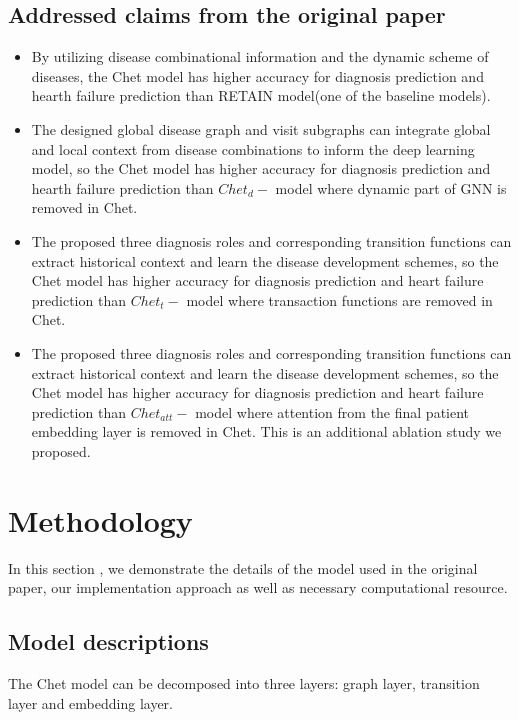 \documentclass[11pt,a4paper]{article}
\begin{document}
\subsection{Addressed claims from the original paper}
\begin{itemize}
    \item By utilizing disease combinational information and the dynamic scheme of diseases, the Chet model has higher accuracy for diagnosis prediction and hearth failure prediction than RETAIN model(one of the baseline models). 
    \item The designed global disease graph and visit subgraphs can integrate global and local context from disease combinations to inform the deep learning model, so the Chet model has higher accuracy for diagnosis prediction and hearth failure prediction than $Chet_d-$ model where dynamic part of GNN is removed in Chet.
    \item The proposed three diagnosis roles and corresponding transition functions can extract historical context and learn the disease development schemes, so the Chet model has higher accuracy for diagnosis prediction and heart failure prediction than $Chet_t-$ model where transaction functions are removed in Chet.
    \item  The proposed three diagnosis roles and corresponding transition functions can extract historical context and learn the disease development schemes, so the Chet model has higher accuracy for diagnosis prediction and heart failure prediction than $Chet_{att}-$ model where attention from the final patient embedding layer is removed in Chet. This is an additional ablation study we proposed.
\end{itemize}

\section{Methodology}
In this section , we demonstrate the details of the model used in the original paper, our implementation approach as well as necessary computational resource.
\subsection{Model descriptions}
The Chet model can be decomposed into three layers: graph layer, transition layer and embedding layer.
\end{document}
